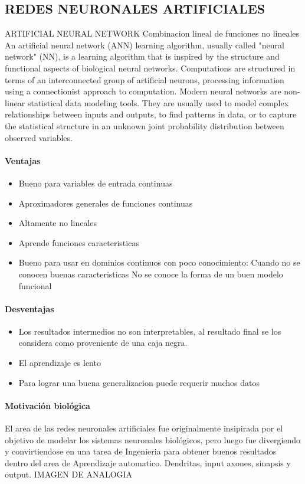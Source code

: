 \documentclass[a4paper,10pt]{article}
\begin{document}
\subsection{REDES NEURONALES ARTIFICIALES}
ARTIFICIAL NEURAL NETWORK
Combinacion lineal de funciones no lineales
An artificial neural network (ANN) learning algorithm, usually called "neural network" (NN), is a learning algorithm that is inspired by the structure and functional aspects 
of biological neural networks. Computations are structured in terms of an interconnected group of artificial neurons, processing information using a connectionist approach 
to computation. Modern neural networks are non-linear statistical data modeling tools. They are usually used to model complex relationships between inputs and outputs, 
to find patterns in data, or to capture the statistical structure in an unknown joint probability distribution between observed variables.
\paragraph {Ventajas}
\begin{itemize}
 \item Bueno para variables de entrada continuas
 \item Aproximadores generales de funciones continuas
 \item Altamente no lineales
 \item Aprende funciones caracteristicas
 \item Bueno para usar en dominios continuos con poco conocimiento:
  \subitem Cuando no se conocen buenas caracteristicas
  \subitem No se conoce la forma de un buen modelo funcional
\end{itemize}
\paragraph {Desventajas}
  \begin{itemize}
  \item Los resultados intermedios no son interpretables, al resultado final se los considera como proveniente de una caja negra.
  \item El aprendizaje es lento
  \item Para lograr una buena generalizacion puede requerir muchos datos
  \end{itemize}

\paragraph {Motivación biológica} 
El area de las redes neuronales artificiales fue originalmente insipirada por el objetivo de modelar los sistemas neuronales biológicos, 
pero luego fue divergiendo
y convirtiendose en una tarea de Ingenieria para obtener buenos resultados dentro del area de Aprendizaje automatico.
Dendritas, input axones, sinapsis y output.
IMAGEN DE ANALOGIA
\end{document}
